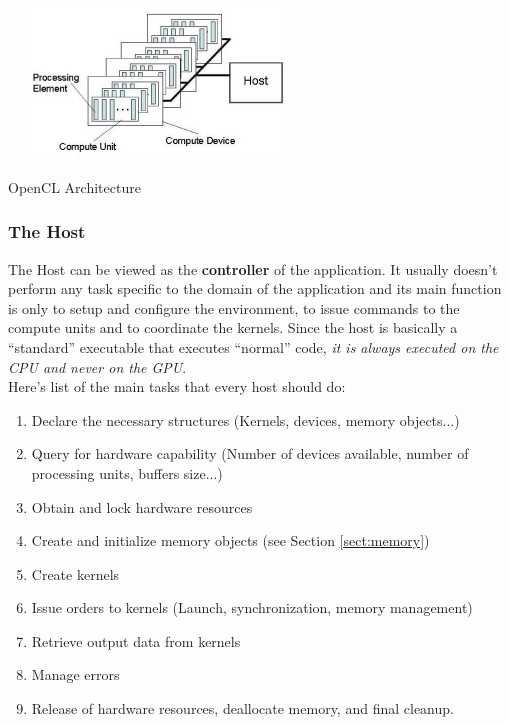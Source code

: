 \begin{figurehere}
 \centering
 \includegraphics[width=8cm, height=4cm]{./eps/OpenCLArch.eps}
 \caption{OpenCL Architecture}
 \label{fig:OpenCLArch}
\end{figurehere}

\subsubsection{The Host}
The Host can be viewed as the \textbf{controller} of the application. It usually doesn't perform any task specific to the domain of the application and its main function is only to setup and configure the environment, to issue commands to the compute units and to coordinate the kernels. Since the host is basically a ``standard'' executable that executes ``normal'' code, \emph{it is always executed on the CPU and never on the GPU}.\\
Here's list of the main tasks that every host should do:

\begin{enumerate}
	\item Declare the necessary structures (Kernels, devices, memory objects...)
	\item Query for hardware capability (Number of devices available, number of processing units, buffers size...)
	\item Obtain and lock hardware resources
	\item Create and initialize memory objects (see Section \ref{sect:memory})
	\item Create kernels
	\item Issue orders to kernels (Launch, synchronization, memory management)
	\item Retrieve output data from kernels
	\item Manage errors
	\item Release of hardware resources, deallocate memory, and final cleanup.
\end{enumerate}

